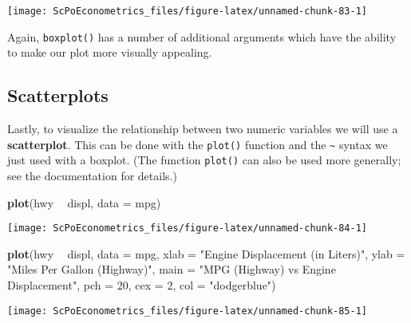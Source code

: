 \documentclass[]{book}
\newenvironment{Shaded}{\begin{snugshade}}{\end{snugshade}}
\newcommand{\KeywordTok}[1]{\textcolor[rgb]{0.13,0.29,0.53}{\textbf{#1}}}
\newcommand{\DataTypeTok}[1]{\textcolor[rgb]{0.13,0.29,0.53}{#1}}
\newcommand{\DecValTok}[1]{\textcolor[rgb]{0.00,0.00,0.81}{#1}}
\newcommand{\StringTok}[1]{\textcolor[rgb]{0.31,0.60,0.02}{#1}}
\newcommand{\OperatorTok}[1]{\textcolor[rgb]{0.81,0.36,0.00}{\textbf{#1}}}
\newcommand{\NormalTok}[1]{#1}
\begin{document}
\begin{center}\texttt{[image: ScPoEconometrics\_files/figure-latex/unnamed-chunk-83-1]} \end{center}

Again, \texttt{boxplot()} has a number of additional arguments which
have the ability to make our plot more visually appealing.

\subsection{Scatterplots}\label{scatterplots}

Lastly, to visualize the relationship between two numeric variables we
will use a \textbf{scatterplot}. This can be done with the
\texttt{plot()} function and the \texttt{\textasciitilde{}} syntax we
just used with a boxplot. (The function \texttt{plot()} can also be used
more generally; see the documentation for details.)

\begin{Shaded}
\begin{Highlighting}[]
\KeywordTok{plot}\NormalTok{(hwy }\OperatorTok{~}\StringTok{ }\NormalTok{displ, }\DataTypeTok{data =}\NormalTok{ mpg)}
\end{Highlighting}
\end{Shaded}

\begin{center}\texttt{[image: ScPoEconometrics\_files/figure-latex/unnamed-chunk-84-1]} \end{center}

\begin{Shaded}
\begin{Highlighting}[]
\KeywordTok{plot}\NormalTok{(hwy }\OperatorTok{~}\StringTok{ }\NormalTok{displ, }\DataTypeTok{data =}\NormalTok{ mpg,}
     \DataTypeTok{xlab =} \StringTok{"Engine Displacement (in Liters)"}\NormalTok{,}
     \DataTypeTok{ylab =} \StringTok{"Miles Per Gallon (Highway)"}\NormalTok{,}
     \DataTypeTok{main =} \StringTok{"MPG (Highway) vs Engine Displacement"}\NormalTok{,}
     \DataTypeTok{pch  =} \DecValTok{20}\NormalTok{,}
     \DataTypeTok{cex  =} \DecValTok{2}\NormalTok{,}
     \DataTypeTok{col  =} \StringTok{"dodgerblue"}\NormalTok{)}
\end{Highlighting}
\end{Shaded}

\begin{center}\texttt{[image: ScPoEconometrics\_files/figure-latex/unnamed-chunk-85-1]} \end{center}
\end{document}
